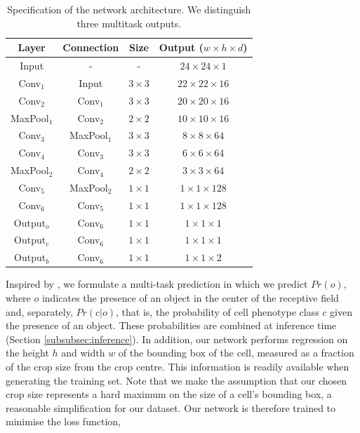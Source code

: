\begin{table}[ht!]
\begin{center}
\begin{tabular}{|c|c|c|c|}
\hline
Layer & Connection & Size & Output ($w \times h \times d$) \\
\hline
Input & - & - & $24 \times 24 \times 1$\\
\hline
Conv$_1$ & Input & ${3\times 3}$ & $22 \times 22 \times 16$  \\
Conv$_2$ & Conv$_1$ & ${3\times 3}$ & $20 \times 20 \times 16$ \\
MaxPool$_1$ & Conv$_2$ & ${2\times 2}$ & $10 \times 10 \times 16$ \\
Conv$_3$ & MaxPool$_1$ & ${3\times 3}$ & $8 \times 8 \times 64$ \\
Conv$_4$ & Conv$_3$ & ${3\times 3}$ & $6 \times 6 \times 64$ \\
MaxPool$_2$ & Conv$_4$ & ${2\times 2}$ & $3 \times 3 \times 64$ \\
Conv$_5$ & MaxPool$_2$ & ${1\times 1}$ & $1 \times 1 \times 128$ \\
Conv$_6$ & Conv$_5$ & ${1\times 1}$ & $1 \times 1 \times 128$ \\
\hline
Output$_o$ & Conv$_6$ & ${1\times 1}$ & $1 \times 1 \times 1$ \\
Output$_c$ & Conv$_6$ & ${1\times 1}$ & $1 \times 1 \times 1$ \\
Output$_b$ & Conv$_6$ & ${1\times 1}$ & $1 \times 1 \times 2$ \\
\hline
\end{tabular}
\end{center}
\caption{Specification of the network architecture. We distinguish three multitask outputs.}
\label{table:nn}
\end{table}

Inspired by \cite{redmon2016you}, we formulate a multi-task prediction in which we predict $Pr(o)$, where $o$ indicates the presence of an object in the center of the receptive field and, separately, $Pr(c | o)$, that is, the probability of cell phenotype class $c$ given the presence of an object. These probabilities are combined at inference time (Section \ref{subsubsec:inference}). In addition, our network performs regression on the height $h$ and width $w$ of the bounding box of the cell, measured as a fraction of the crop size from the crop centre. This information is readily available when generating the training set. Note that we make the assumption that our chosen crop size represents a hard maximum on the size of a cell's bounding box, a reasonable simplification for our dataset. Our network is therefore trained to minimise the loss function,

